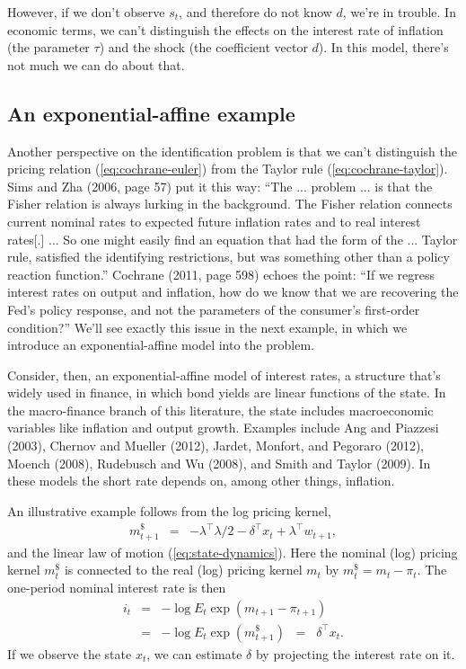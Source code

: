 \documentclass[12pt]{article}
\begin{document}
{However, if we don't observe $s_t$, and therefore do not know $d$, we're in trouble.
In economic terms,
we can't distinguish the effects on the interest rate
of inflation (the parameter $\tau$) and the shock (the coefficient vector $d$).
In this model, there's not much we can do about that.


\subsection{An exponential-affine example}
\label{sec:example-affine}

Another perspective on the identification problem
is that we can't distinguish the pricing relation (\ref{eq:cochrane-euler})
from the Taylor rule (\ref{eq:cochrane-taylor}).
Sims and Zha (2006, page 57) put it this way:
``The ... problem ...  is that the
Fisher relation is always lurking in the background.
The Fisher relation connects current nominal rates to expected future inflation rates
and to real interest rates[.] ...
So one might easily find an equation that had the form of the ... Taylor rule,
satisfied the identifying restrictions, but was something other than a policy reaction function.''
Cochrane (2011, page 598) echoes the point:
``If we regress interest rates on output and inflation, how do we know
that we are recovering the Fed's policy response, and not the parameters
of the consumer's first-order condition?''
We'll see exactly this issue in the next example,
in which we introduce an exponential-affine model into the problem.


Consider, then, an exponential-affine model of interest rates,
a structure that's widely used in finance,
in which bond yields are linear functions of the state.
In the macro-finance branch of this literature,
the state includes macroeconomic variables like inflation and output growth.
Examples include
Ang and Piazzesi (2003),
Chernov and Mueller (2012),
Jardet, Monfort, and Pegoraro (2012),
Moench (2008),
Rudebusch and Wu (2008),
and Smith and Taylor (2009).
In these models the short rate depends on,
among other things, inflation.

An illustrative example follows from the log pricing kernel,
\begin{eqnarray}
    m^{\$}_{t+1} &=& - \lambda^\top \lambda/2 - \delta^\top x_{t} + \lambda^\top w_{t+1} ,
    \label{eq:example2-logm}
\end{eqnarray}
and the linear law of motion (\ref{eq:state-dynamics}).
Here the nominal (log) pricing kernel $m^{\$}_{t}$ is
connected to the real (log) pricing kernel $m_{t}$
by $m^{\$}_t = m_t  - {\pi_t} $.
The one-period nominal interest rate is then
\begin{eqnarray}
     i_t &=& - \log E_t \exp( m_{t+1}-\pi_{t+1})
        \label{eq:macrofin-euler} \\
        &=& - \log E_t \exp(m^{\$}_{t+1})
        \;\;=\;\; \delta^\top x_t .
        \label{eq:example2-shortrate}
\end{eqnarray}
If we observe the state $x_t$, we can estimate $\delta$
by projecting the interest rate on it.

}
\end{document}
